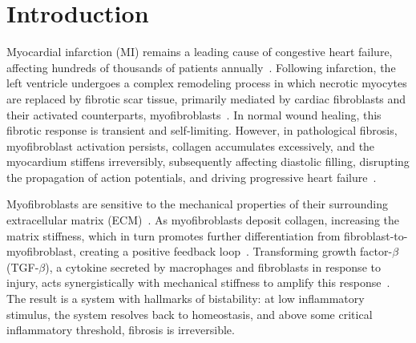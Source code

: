 \documentclass[Afour,sageh,times]{sagej}
\begin{document}
\section{Introduction}
\label{sec:intro}
Myocardial infarction (MI) remains a leading cause of congestive heart failure, affecting hundreds of thousands of patients annually~\citep{mozaffarian2016heart,hellermann2005heart,anavekar2004relation}. Following infarction, the left ventricle undergoes a complex remodeling process in which necrotic myocytes are replaced by fibrotic scar tissue, primarily mediated by cardiac fibroblasts and their activated counterparts, myofibroblasts~\citep{cohn2000cardiac, segers2008stem}. In normal wound healing, this fibrotic response is transient and self-limiting. However, in pathological fibrosis, myofibroblast activation persists, collagen accumulates excessively, and the myocardium stiffens irreversibly, subsequently affecting diastolic filling, disrupting the propagation of action potentials, and driving progressive heart failure~\citep{song2012heart, hinz2007formation, spinale2007myocardial, gaudron2001time, pfeffer1991progressive}.

Myofibroblasts are sensitive to the mechanical properties of their surrounding extracellular matrix (ECM)~\citep{hinz2010myofibroblast}. As myofibroblasts deposit collagen, increasing the matrix stiffness, which in turn promotes further differentiation from fibroblast-to-myofibroblast, creating a positive feedback loop~\citep{younesi2024fibroblast, gibb2020myofibroblasts}. Transforming growth factor-$\beta$ (TGF-$\beta$), a cytokine secreted by macrophages and fibroblasts in response to injury, acts synergistically with mechanical stiffness to amplify this response~\citep{tiskratok2025extracellular, frangogiannis2022transforming, frangogiannis2020transforming}. The result is a system with hallmarks of bistability: at low inflammatory stimulus, the system resolves back to homeostasis, and above some critical inflammatory threshold, fibrosis is irreversible.
\end{document}
